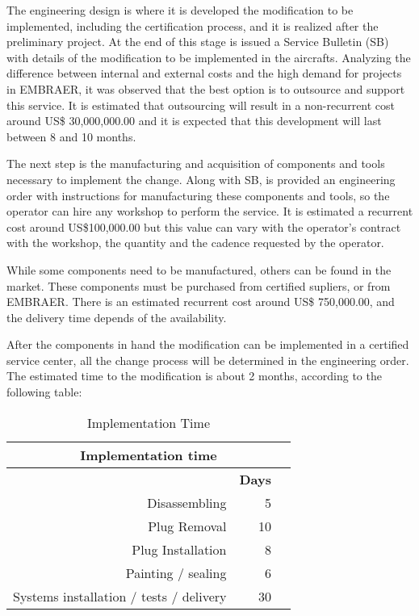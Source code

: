 The engineering design is where it is developed the modification to be implemented, including the certification process, and it is realized after the preliminary project. At the end of this stage is issued a Service Bulletin 
(SB) with details of the modification to be implemented in the aircrafts. Analyzing the difference between internal and external costs and the high demand for projects in EMBRAER, it was observed that the best option is to 
outsource and support this service. It is estimated that outsourcing will result in a non-recurrent cost around US\$ 30,000,000.00 and it is expected that this development will last between 8 and 10 months.

The next step is the manufacturing and acquisition of components and tools necessary to implement the change. Along with SB, is provided an engineering order with instructions for manufacturing these components and tools, so 
the operator can hire any workshop to perform the service. It is estimated a recurrent cost around US\$100,000.00 but this value can vary with the operator's contract with the workshop, the quantity and the cadence requested 
by the operator.

While some components need to be manufactured, others can be found in the market. These components must be purchased from certified supliers, or from EMBRAER. There is an estimated recurrent cost around US\$ 750,000.00, 
and the delivery time depends of the availability.

After the components in hand the modification can be implemented in a certified service center, all the change process will be determined in the engineering order. The estimated time to the modification is about 2 months, 
according to the following table:

\begin{table}[htbp]
  \centering
  \caption{Implementation Time}
    \begin{tabular}{rrr}
    \toprule
    \multicolumn{3}{c}{\textbf{Implementation time}} \\
    \midrule
          & \multicolumn{1}{c}{\textbf{Days}} &  \\
    Disassembling & 5     &  \\
    Plug Removal & 10    &  \\
    Plug Installation & 8     &  \\
    Painting / sealing & 6     &  \\
    Systems installation / tests / delivery & 30    &  \\
    \bottomrule
    \end{tabular}%
  \label{tab:imp_time}%
\end{table}%

